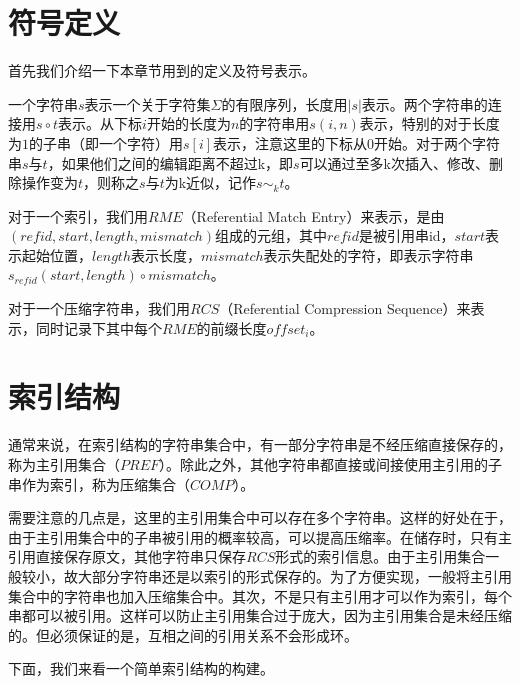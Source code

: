 ﻿\documentclass{sysuthesis}
\begin{document}
\section{符号定义}
首先我们介绍一下本章节用到的定义及符号表示。\par
一个字符串$s$表示一个关于字符集$\Sigma$的有限序列，长度用$|s|$表示。两个字符串的连接用$s \circ t$表示。从下标$i$开始的长度为$n$的字符串用$s(i, n)$表示，特别的对于长度为$1$的子串（即一个字符）用$s[i]$表示，注意这里的下标从0开始。对于两个字符串$s$与$t$，如果他们之间的编辑距离不超过k，即$s$可以通过至多k次插入、修改、删除操作变为$t$，则称之$s$与$t$为k近似，记作$s \sim_{k} t$。\par
对于一个索引，我们用$RME$（Referential Match Entry）来表示，是由$(refid, start, length, mismatch)$组成的元组，其中$refid$是被引用串id，$start$表示起始位置，$length$表示长度，$mismatch$表示失配处的字符，即表示字符串$s_{refid}(start, length) \circ mismatch$。\par
对于一个压缩字符串，我们用$RCS$（Referential Compression Sequence）来表示，同时记录下其中每个$RME$的前缀长度$offset_{i}$。



\section{索引结构}
通常来说，在索引结构的字符串集合中，有一部分字符串是不经压缩直接保存的，称为主引用集合（$PREF$）。除此之外，其他字符串都直接或间接使用主引用的子串作为索引，称为压缩集合（$COMP$）。\par
需要注意的几点是，这里的主引用集合中可以存在多个字符串。这样的好处在于，由于主引用集合中的子串被引用的概率较高，可以提高压缩率。在储存时，只有主引用直接保存原文，其他字符串只保存$RCS$形式的索引信息。由于主引用集合一般较小，故大部分字符串还是以索引的形式保存的。为了方便实现，一般将主引用集合中的字符串也加入压缩集合中。其次，不是只有主引用才可以作为索引，每个串都可以被引用。这样可以防止主引用集合过于庞大，因为主引用集合是未经压缩的。但必须保证的是，互相之间的引用关系不会形成环。\par
下面，我们来看一个简单索引结构的构建。
\end{document}
